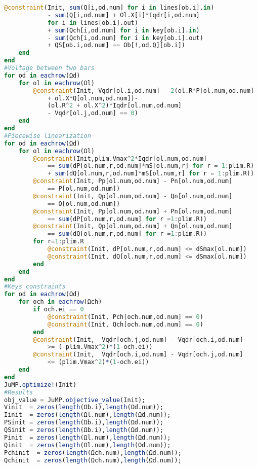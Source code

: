 \begin{lstlisting}[language = Julia, firstnumber = 208]
        @constraint(Init, sum(Q[i,od.num] for i in lines[ob.i].in) 
            - sum(Q[i,od.num] + Ωl.X[i]*Iqdr[i,od.num] 
            for i in lines[ob.i].out)
            + sum(Qch[i,od.num] for i in key[ob.i].in)
            - sum(Qch[i,od.num] for i in key[ob.i].out)
            + QS[ob.i,od.num] == Ωb[!,od.Q][ob.i])
    end
end
#Voltage between two bars
for od in eachrow(Ωd)
    for ol in eachrow(Ωl)
        @constraint(Init, Vqdr[ol.i,od.num] - 2(ol.R*P[ol.num,od.num] 
            + ol.X*Q[ol.num,od.num])- 
            (ol.R^2 + ol.X^2)*Iqdr[ol.num,od.num] 
            - Vqdr[ol.j,od.num] == 0)
    end
end
#Piecewise linearization 
for od in eachrow(Ωd)    
    for ol in eachrow(Ωl)
        @constraint(Init,plim.Vmax^2*Iqdr[ol.num,od.num] 
            == sum(dP[ol.num,r,od.num]*mS[ol.num,r] for r = 1:plim.R) 
            + sum(dQ[ol.num,r,od.num]*mS[ol.num,r] for r = 1:plim.R)) 
        @constraint(Init, Pp[ol.num,od.num] - Pn[ol.num,od.num] 
            == P[ol.num,od.num])
        @constraint(Init, Qp[ol.num,od.num] - Qn[ol.num,od.num] 
            == Q[ol.num,od.num])
        @constraint(Init, Pp[ol.num,od.num] + Pn[ol.num,od.num] 
            == sum(dP[ol.num,r,od.num] for r =1:plim.R))
        @constraint(Init, Qp[ol.num,od.num] + Qn[ol.num,od.num] 
            == sum(dQ[ol.num,r,od.num] for r =1:plim.R))
        for r=1:plim.R
            @constraint(Init, dP[ol.num,r,od.num] <= dSmax[ol.num])
            @constraint(Init, dQ[ol.num,r,od.num] <= dSmax[ol.num])
        end
    end
end
#Keys constraints
for od in eachrow(Ωd)    
    for och in eachrow(Ωch)
        if och.ei == 0
            @constraint(Init, Pch[och.num,od.num] == 0)
            @constraint(Init, Qch[och.num,od.num] == 0)
        end
        @constraint(Init,  Vqdr[och.j,od.num] - Vqdr[och.i,od.num] 
            >= (-plim.Vmax^2)*(1-och.ei))
        @constraint(Init,  Vqdr[och.i,od.num] - Vqdr[och.j,od.num] 
            <= (plim.Vmax^2)*(1-och.ei))
    end
end
JuMP.optimize!(Init)
#Results
obj_value = JuMP.objective_value(Init);
Vinit  = zeros(length(Ωb.i),length(Ωd.num));   
Iinit  = zeros(length(Ωl.num),length(Ωd.num));
PSinit = zeros(length(Ωb.i),length(Ωd.num));   
QSinit = zeros(length(Ωb.i),length(Ωd.num));
Pinit  = zeros(length(Ωl.num),length(Ωd.num)); 
Qinit  = zeros(length(Ωl.num),length(Ωd.num));
Pchinit  = zeros(length(Ωch.num),length(Ωd.num)); 
Qchinit  = zeros(length(Ωch.num),length(Ωd.num));


\end{lstlisting}
